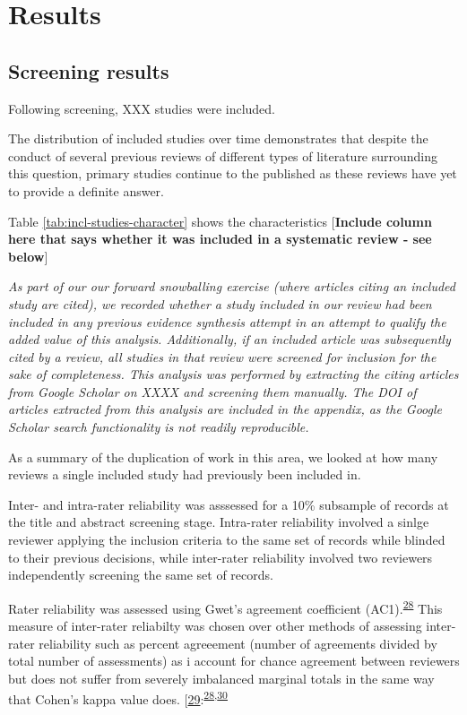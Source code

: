 \documentclass[a4paper, twoside]{templates/ociamthesis}
\begin{document}
\hypertarget{results}{%
\section{Results}\label{results}}

\hypertarget{screening-results}{%
\subsection{Screening results}\label{screening-results}}

Following screening, XXX studies were included.

The distribution of included studies over time demonstrates that despite the conduct of several previous reviews of different types of literature surrounding this question, primary studies continue to the published as these reviews have yet to provide a definite answer.

Table \ref{tab:incl-studies-character} shows the characteristics {[}\textbf{Include column here that says whether it was included in a systematic review - see below}{]}

\emph{As part of our our forward snowballing exercise (where articles citing an included study are cited), we recorded whether a study included in our review had been included in any previous evidence synthesis attempt in an attempt to qualify the added value of this analysis. Additionally, if an included article was subsequently cited by a review, all studies in that review were screened for inclusion for the sake of completeness. This analysis was performed by extracting the citing articles from Google Scholar on XXXX and screening them manually. The DOI of articles extracted from this analysis are included in the appendix, as the Google Scholar search functionality is not readily reproducible.}

As a summary of the duplication of work in this area, we looked at how many reviews a single included study had previously been included in.

Inter- and intra-rater reliability was asssessed for a 10\% subsample of records at the title and abstract screening stage. Intra-rater reliability involved a sinlge reviewer applying the inclusion criteria to the same set of records while blinded to their previous decisions, while inter-rater reliability involved two reviewers independently screening the same set of records.

Rater reliability was assessed using Gwet's agreement coefficient (AC1).\textsuperscript{\protect\hyperlink{ref-gwet2008}{28}} This measure of inter-rater reliabilty was chosen over other methods of assessing inter-rater reliability such as percent agreeement (number of agreements divided by total number of assessments) as i account for chance agreement between reviewers but does not suffer from severely imbalanced marginal totals in the same way that Cohen's kappa value does. {[}\protect\hyperlink{ref-cohen1960}{29}:\textsuperscript{\protect\hyperlink{ref-gwet2008}{28},\protect\hyperlink{ref-wongpakaran2013}{30}}
\end{document}
